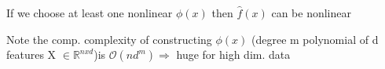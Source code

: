 If we choose at least one nonlinear $\phi(x)$ then $\hat{f}(x)$ can be nonlinear

Note the comp. complexity of constructing $\phi(x)$ (degree m polynomial of d features X $\in \mathbb{R}^{nxd}$)is $\mathcal{O}(nd^m) \Rightarrow$ huge for high dim. data




\vfill\null \columnbreak


